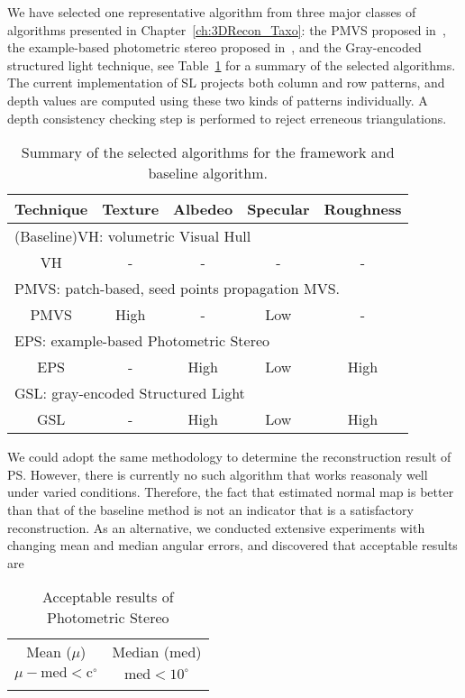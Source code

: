 We have selected one representative algorithm from three major classes of algorithms presented in Chapter~\ref{ch:3DRecon_Taxo}: the PMVS proposed in~\cite{furukawa2010accurate}, the example-based photometric stereo proposed in~\cite{hertzmann2005example}, and the Gray-encoded structured light technique, see Table~\ref{tab:selected_algo} for a summary of the selected algorithms. The current implementation of SL projects both column and row patterns, and depth values are computed using these two kinds of patterns individually. A depth consistency checking step is performed to reject erreneous triangulations.
\begin{table}[!htbp]
\centering
\begin{tabular}{c|c|c|c|c}
\hline
Technique & Texture & Albedeo & Specular & Roughness\\
\hline\hline
\multicolumn{5}{l}{(Baseline)VH: volumetric Visual Hull}\\
\hline
VH & - & - & - & -\\
\hline\hline
\multicolumn{5}{l}{PMVS: patch-based, seed points propagation MVS.}\\
\hline
PMVS & High & - & Low & -\\
\hline\hline
\multicolumn{5}{l}{EPS: example-based Photometric Stereo}\\
\hline
EPS & - & High & Low & High \\
\hline\hline
\multicolumn{5}{l}{GSL: gray-encoded Structured Light}\\
\hline
GSL & - & High & Low & High\\
\hline
\end{tabular}
\caption{Summary of the selected algorithms for the framework and baseline algorithm.}
\label{tab:selected_algo}
\end{table}

We could adopt the same methodology to determine the reconstruction result of PS. However, there is currently no such algorithm that works reasonaly well under varied conditions. Therefore, the fact that estimated normal map is better than that of the baseline method is not an indicator that is a satisfactory reconstruction. As an alternative, we conducted extensive experiments with changing mean and median angular errors, and discovered that acceptable results are
\begin{table}[!htbp]
\centering
\begin{tabular}{cc}
\hline
Mean ($\mu$) & Median (med)\\
$\mu - \text{med} < \text{c}^\circ$ & $\text{med}<10^\circ$\\
\hline
\caption{Acceptable results of Photometric Stereo}
\label{tab:ps_criteria}
\end{tabular}
\end{table}

